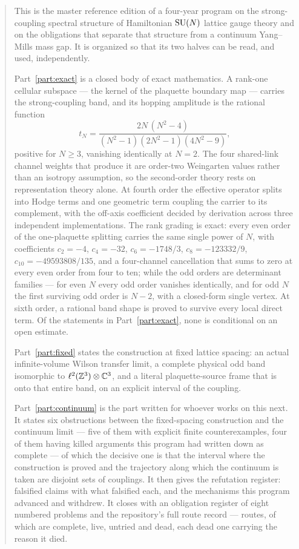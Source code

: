 \begin{abstract}
\noindent
This is the master reference edition of a four-year program on the
strong-coupling spectral structure of Hamiltonian $\SU(N)$ lattice gauge
theory and on the obligations that separate that structure from a
continuum Yang--Mills mass gap. It is organized so that its two halves can
be read, and used, independently.

Part~\ref{part:exact} is a closed body of exact mathematics. A
rank-one cellular subspace --- the kernel of the plaquette boundary map ---
carries the strong-coupling band, and its hopping amplitude is the
rational function
\[
  t_N = \frac{2N\,(N^2-4)}{(N^2-1)(2N^2-1)(4N^2-9)},
\]
positive for $N \ge 3$, vanishing identically at $N = 2$. The four
shared-link channel weights that produce it are order-two Weingarten
values rather than an isotropy assumption, so the second-order theory
rests on representation theory alone. At fourth order the effective
operator splits into Hodge terms and one geometric term coupling the
carrier to its complement, with the off-axis coefficient decided by
derivation across three independent implementations. The rank grading is
exact: every even order of the one-plaquette splitting carries the same
single power of $N$, with coefficients
$c_2 = -4$, $c_4 = -32$, $c_6 = -1748/3$, $c_8 = -123332/9$,
$c_{10} = -49593808/135$, and a four-channel cancellation that sums to
zero at every even order from four to ten; while the odd orders are
determinant families --- for even $N$ every odd order vanishes
identically, and for odd $N$ the first surviving odd order is $N-2$, with
a closed-form single vertex. At sixth order, a rational band shape is
proved to survive every local direct term. Of the statements in
Part~\ref{part:exact}, none is conditional on an open estimate.

Part~\ref{part:fixed} states the construction at fixed lattice spacing:
an actual infinite-volume Wilson transfer limit, a complete physical odd
band isomorphic to $\ell^2(\Z^3) \otimes \C^3$, and a literal
plaquette-source frame that is onto that entire band, on an explicit
interval of the coupling.

Part~\ref{part:continuum} is the part written for whoever works on this
next. It states six obstructions between the fixed-spacing construction
and the continuum limit --- five of them with explicit finite
counterexamples, four of them having killed arguments this program had
written down as complete --- of which the decisive one is that the
interval where the construction is proved and the trajectory along which
the continuum is taken are disjoint sets of couplings. It then gives the
refutation register: \ContraFalsified{} falsified claims with what
falsified each, and the mechanisms this program advanced and withdrew. It
closes with an obligation register of eight numbered problems and the
repository's full route record --- \RouteTotal{} routes, of which
\RouteDone{} are complete, \RouteLive{} live, \RouteUntried{} untried and
\RouteDead{} dead, each dead one carrying the reason it died.


\end{abstract}
